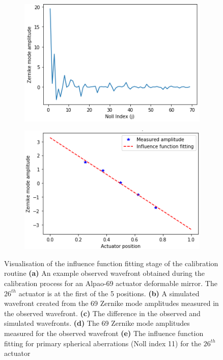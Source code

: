 \begin{figure}[h]
	\begin{subfigure}{0.45\textwidth}
		\centering
		\includegraphics[width=1\linewidth, scale=0.5]{images/measured_zernike_modes.png}
		\caption{}
		\label{fig:measured_zernike_modes}
	\end{subfigure}
	\begin{subfigure}{0.45\textwidth}
		\centering
		\includegraphics[width=1\linewidth, scale=0.5]{images/influence_function_11.png}
		\caption{}		
		\label{fig:influence_function_11}
	\end{subfigure}
	\caption[Visualisation of the influence function fitting stage of the calibration routine]{Visualisation of the influence function fitting stage of the calibration routine \textbf{(a)} An example observed wavefront obtained during the calibration process for an Alpao-69 actuator deformable mirror. The $26^{th}$ actuator is at the first of the 5 positions. \textbf{(b)} A simulated wavefront created from the 69 Zernike mode amplitudes measured in the observed wavefront. \textbf{(c)} The difference in the observed and simulated wavefronts. \textbf{(d)} The 69 Zernike mode amplitudes measured for the observed wavefront \textbf{(e)} The influence function fitting for primary spherical aberrations (Noll index 11) for the $26^{th}$ actuator}
	\label{fig:wavefront_decomposition}
\end{figure}


